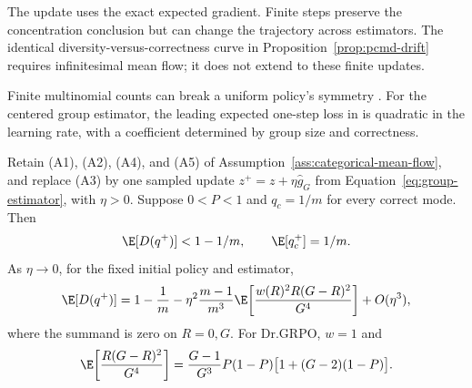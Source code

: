 The update uses the exact expected gradient. Finite steps preserve the
concentration conclusion but can change the trajectory across estimators.
The identical diversity-versus-correctness curve in
Proposition~\ref{prop:pcmd-drift} requires infinitesimal mean flow;
it does not extend to these finite updates.

Finite multinomial counts can break a uniform policy's symmetry
\citep[Proposition~A.1]{lochab2026ucpo}. For the centered group estimator,
the leading expected one-step loss in \pmd{} is quadratic in the learning
rate, with a coefficient determined by group size and correctness.

\begin{proposition}
\enforcehalffinalproseline
\label{prop:stochastic-pcmd}
Retain (A1), (A2), (A4), and (A5) of
Assumption~\ref{ass:categorical-mean-flow}, and replace (A3) by one sampled
update $z^+=z+\eta\widehat g_G$ from
Equation~\eqref{eq:group-estimator}, with $\eta>0$. Suppose $0<P<1$ and $q_c=1/m$ for every correct mode. Then
\begin{equation}
 \E[D(q^+)]<1-1/m,
 \qquad \E[q_c^+]=1/m.
 \label{eq:stochastic-strict-decrease}
\end{equation}
As $\eta\to0$, for the fixed initial policy and estimator,
\begin{equation}
 \E[D(q^+)]
 =1-\frac1m
  -\eta^2\frac{m-1}{m^3}
    \E\!\left[\frac{w(R)^2R(G-R)^2}{G^4}\right]
  +O(\eta^3),
 \label{eq:stochastic-pcmd-expansion}
\end{equation}
where the summand is zero on $R=0,G$. For Dr.GRPO, $w=1$ and
\begin{equation}
 \E\!\left[\frac{R(G-R)^2}{G^4}\right]
 =\frac{G-1}{G^3}P(1-P)\big[1+(G-2)(1-P)\big].
 \label{eq:stochastic-dr-coefficient}
\end{equation}
\end{proposition}

